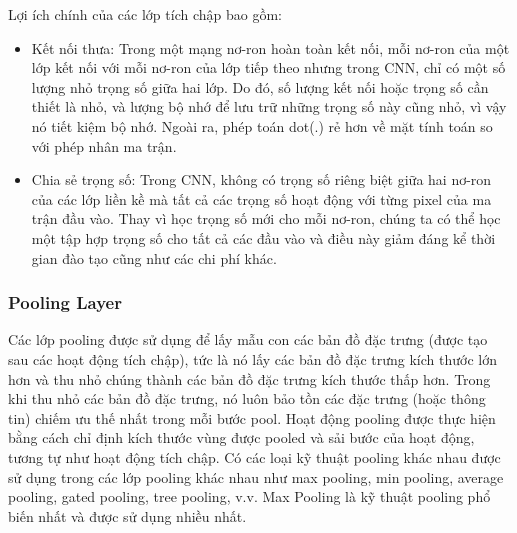 \begin{enumerate}
    Lợi ích chính của các lớp tích chập bao gồm:
    \begin{itemize}
        \item Kết nối thưa: Trong một mạng nơ-ron hoàn toàn kết nối, mỗi nơ-ron của một lớp kết nối với mỗi nơ-ron của lớp tiếp theo nhưng trong CNN, chỉ có một số lượng nhỏ trọng số giữa hai lớp. Do đó, số lượng kết nối hoặc trọng số cần thiết là nhỏ, và lượng bộ nhớ để lưu trữ những trọng số này cũng nhỏ, vì vậy nó tiết kiệm bộ nhớ. Ngoài ra, phép toán dot(.) rẻ hơn về mặt tính toán so với phép nhân ma trận.
        \item Chia sẻ trọng số: Trong CNN, không có trọng số riêng biệt giữa hai nơ-ron của các lớp liền kề mà tất cả các trọng số hoạt động với từng pixel của ma trận đầu vào. Thay vì học trọng số mới cho mỗi nơ-ron, chúng ta có thể học một tập hợp trọng số cho tất cả các đầu vào và điều này giảm đáng kể thời gian đào tạo cũng như các chi phí khác.
    \end{itemize}
\end{enumerate}

\subsubsection{Pooling Layer}

Các lớp pooling được sử dụng để lấy mẫu con các bản đồ đặc trưng (được tạo sau các hoạt động tích chập), tức là nó lấy các bản đồ đặc trưng kích thước lớn hơn và thu nhỏ chúng thành các bản đồ đặc trưng kích thước thấp hơn. Trong khi thu nhỏ các bản đồ đặc trưng, nó luôn bảo tồn các đặc trưng (hoặc thông tin) chiếm ưu thế nhất trong mỗi bước pool. Hoạt động pooling được thực hiện bằng cách chỉ định kích thước vùng được pooled và sải bước của hoạt động, tương tự như hoạt động tích chập. Có các loại kỹ thuật pooling khác nhau được sử dụng trong các lớp pooling khác nhau như max pooling, min pooling, average pooling, gated pooling, tree pooling, v.v. Max Pooling là kỹ thuật pooling phổ biến nhất và được sử dụng nhiều nhất.

